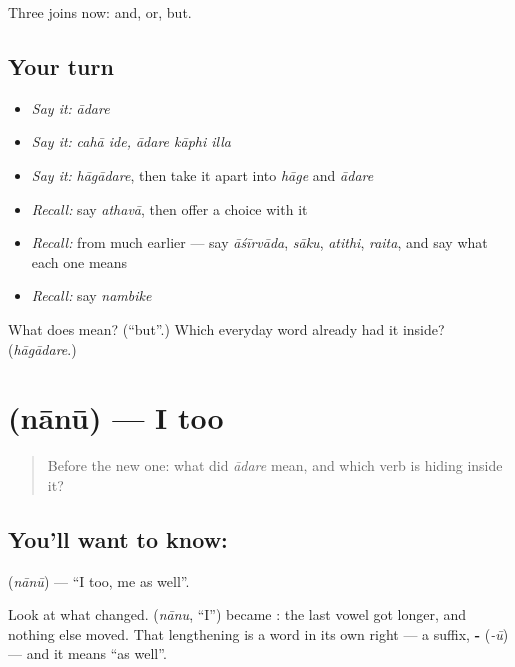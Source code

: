 \begin{grammarlens}[title={What you've built}]
Three joins now: and, or, but.
\end{grammarlens}

\subsection*{Your turn}
\begin{itemize}
\raggedright
  \item \emph{Say it:} \emph{ādare}
  \item \emph{Say it:} \emph{cahā ide, ādare kāphi illa}
  \item \emph{Say it:} \emph{hāgādare}, then take it apart into \emph{hāge} and \emph{ādare}
  \item \emph{Recall:} say \emph{athavā}, then offer a choice with it
  \item \emph{Recall:} from much earlier — say \emph{āśīrvāda}, \emph{sāku}, \emph{atithi}, \emph{raita}, and say what each one means
  \item \emph{Recall:} say \emph{nambike}
\end{itemize}

\begin{tcolorbox}[breakable,colback=teal!4,colframe=teal!35!black,title={Before you move on}]
What does  mean? (\textquotedblleft{}but\textquotedblright{}.) Which everyday word already had it inside? (\emph{hāgādare}.)
\end{tcolorbox}
\section[\texorpdfstring{\kn{ನಾನೂ} (nānū)}{ನಾನೂ (nānū)}]{ (nānū) — I too}

\label{lesson:KA-C67-and-too}



\begin{quote}
Before the new one: what did \emph{ādare} mean, and which verb is hiding inside it?
\end{quote}

\subsection*{You'll want to know: }
\textbf{} (\emph{nānū}) — \textquotedblleft{}I too, me as well\textquotedblright{}.

Look at what changed.  (\emph{nānu}, \textquotedblleft{}I\textquotedblright{}) became : the last vowel got longer, and nothing else moved. That lengthening is a word in its own right — a suffix, \textbf{-} (\emph{-ū}) — and it means \textquotedblleft{}as well\textquotedblright{}.

